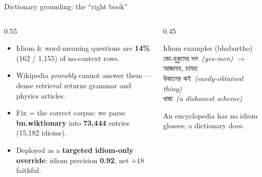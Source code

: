 \documentclass[aspectratio=169,11pt,t]{beamer}
\newcommand{\bn}[1]{{\bnfont #1}}
\newcommand{\bng}[2]{{\bnfont #1}~{\footnotesize\itshape\color{soft}(#2)}}
\newcommand{\metric}[1]{{\color{primary}\bfseries #1}}
\newcommand{\good}[1]{{\color{good}\bfseries #1}}
\begin{document}
\begin{frame}{Dictionary grounding: the ``right book''}
  \begin{columns}[T]
    \begin{column}{0.55\textwidth}
      \begin{itemize}
        \item Idiom \& word-meaning questions are \metric{14\%} (162 / 1{,}155) of no-context rows.
        \item Wikipedia \emph{provably} cannot answer them — dense retrieval returns grammar and physics articles.
        \item Fix = the correct corpus: we parse \textbf{bn.wiktionary} into \metric{73{,}444} entries (15{,}182 idioms).
        \item Deployed as a \textbf{targeted idiom-only override}: idiom precision \good{0.92}, net $+18$ faithful.
      \end{itemize}
    \end{column}
    \begin{column}{0.45\textwidth}
      \small
      \begin{block}{Idiom examples (bhabartho)}
        \bng{জো-হুকুমের দল}{yes-men} $\to$ \bn{আজ্ঞাবহ, চামচা}\\[0.5em]
        \bng{উজানের কই}{easily-obtained thing}\\[0.5em]
        \bng{ধান্ধা}{a dishonest scheme}
      \end{block}
      {\footnotesize\color{soft} An encyclopedia has no idiom glosses; a dictionary does.}
    \end{column}
  \end{columns}
\end{frame}
\end{document}

